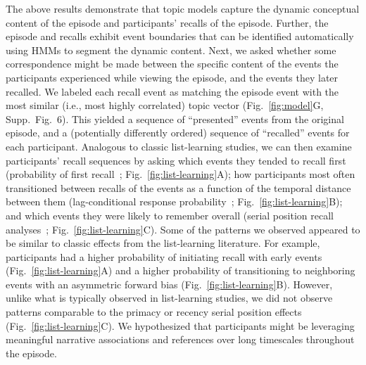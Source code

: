 \documentclass[10pt]{article}
\newcommand{\matchmats}{6}
\begin{document}
The above results demonstrate that topic models capture the dynamic conceptual content of the episode and participants' recalls of the episode.  Further, the episode and recalls exhibit event boundaries that can be identified automatically using HMMs to segment the dynamic content.  Next, we asked whether some correspondence might be made between the specific content of the events the participants experienced while viewing the episode, and the events they later recalled.  We labeled each recall event as matching the episode event with the most similar (i.e., most highly correlated) topic vector (Fig.~\ref{fig:model}G, Supp.\ Fig.~\matchmats).  This yielded a sequence of ``presented'' events from the original episode, and a (potentially differently ordered) sequence of ``recalled'' events for each participant.  Analogous to classic list-learning studies, we can then examine participants' recall sequences by asking which events they tended to recall first (probability of first recall~\citep{AtkiShif68, PostPhil65, WelcBurn24}; Fig.~\ref{fig:list-learning}A); how participants most often transitioned between recalls of the events as a function of the temporal distance between them (lag-conditional response probability~\citep{Kaha96}; Fig.~\ref{fig:list-learning}B); and which events they were likely to remember overall (serial position recall analyses~\citep{Murd62a}; Fig.~\ref{fig:list-learning}C). Some of the patterns we observed appeared to be similar to classic effects from the list-learning literature.  For example, participants had a higher probability of initiating recall with early events (Fig.~\ref{fig:list-learning}A) and a higher probability of transitioning to neighboring events with an asymmetric forward bias (Fig.~\ref{fig:list-learning}B). However, unlike what is typically observed in list-learning studies, we did not observe patterns comparable to the primacy or recency serial position effects (Fig.~\ref{fig:list-learning}C).  We hypothesized that participants might be leveraging meaningful narrative associations and references over long timescales throughout the episode.
\end{document}
